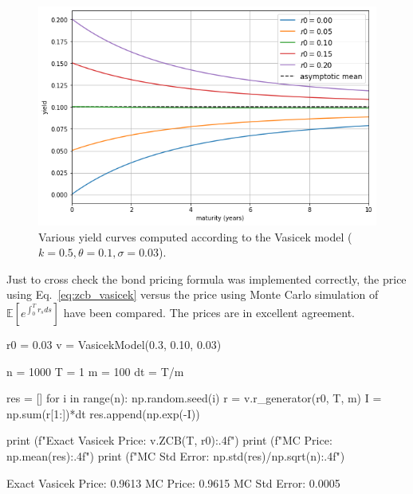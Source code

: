 \begin{figure}[htb]
    \centering
    \includegraphics[width=0.7\linewidth]{figures/vasicek_yields}
    \caption{Various yield curves computed according to the Vasicek model ($k=0.5, \theta=0.1, \sigma=0.03$).}
    \label{fig:yield_vasicek}
\end{figure}

Just to cross check the bond pricing formula was implemented correctly, the price using Eq.~\ref{eq:zcb_vasicek} versus the price using Monte Carlo simulation of $\mathbb{E}\left[e^{\int_0^T r_s ds}\right]$ have been compared. The prices are in excellent agreement.

\begin{ipython}
r0 = 0.03
v = VasicekModel(0.3, 0.10, 0.03)

n = 1000
T = 1
m = 100
dt = T/m

res = []
for i in range(n):
    np.random.seed(i)
    r = v.r_generator(r0, T, m)
    I = np.sum(r[1:])*dt
    res.append(np.exp(-I))

print (f"Exact Vasicek Price: {v.ZCB(T, r0):.4f}")
print (f"MC Price: {np.mean(res):.4f}")
print (f"MC Std Error: {np.std(res)/np.sqrt(n):.4f}")
\end{ipython}
\begin{ioutput}
Exact Vasicek Price: 0.9613
MC Price: 0.9615
MC Std Error: 0.0005
\end{ioutput}

